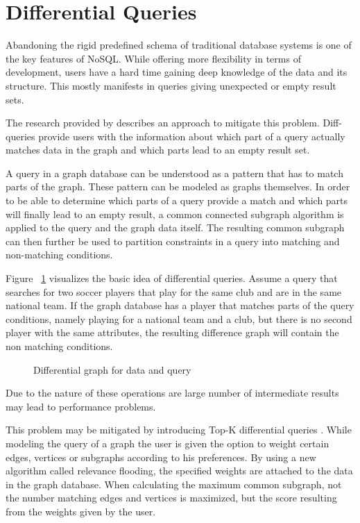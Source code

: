 \documentclass{sig-alternate}
\begin{document}
\section{Differential Queries}

Abandoning the rigid predefined schema of traditional database systems is one of the 
key features of NoSQL. While offering more flexibility in terms of development,
users have a hard time gaining deep knowledge of the data and its structure.
This mostly manifests in queries giving unexpected or empty result sets.

The research provided by \cite{vasilyeva2014graphmcs} describes an approach to mitigate this problem.
Diff-queries provide users with the information about which part of a query actually
matches data in the graph and which parts lead to an empty result set.

A query in a graph database can be understood as a pattern that has to match parts of the graph.
These pattern can be modeled as graphs themselves. 
In order to be able to determine which parts of a query provide a match
and which parts will finally lead to an empty result, a common connected subgraph algorithm is
applied to the query and the graph data itself.
The resulting common subgraph can then further be used to partition 
constraints in a query into matching and non-matching conditions.

Figure ~\ref{fig:diffquery} visualizes the basic idea of
differential queries. Assume a query that searches for two soccer 
players that play for the same club and are in the same national team.
If the graph database has a player that matches parts of the query conditions,
namely playing for a national team and a club, but there is no second player with the 
same attributes, the resulting difference graph will contain the non matching conditions.

\begin{figure}[H]
\centering
{}
\caption{Differential graph for data and query \cite{vasilyeva2014top}}
\label{fig:diffquery}
\end{figure}


Due to the nature of these operations are large number of intermediate results 
may lead to performance problems.


This problem may be mitigated by introducing Top-K differential queries \cite{vasilyeva2014top}. 
While modeling the query of a graph the user is given the option to weight 
certain edges, vertices or subgraphs according to his preferences.
By using a new algorithm called relevance flooding, the specified weights are 
attached to the data in the graph database.
When calculating the maximum common subgraph, not the number matching edges and
vertices is maximized, but the score resulting from the weights given by the user.
\end{document}
